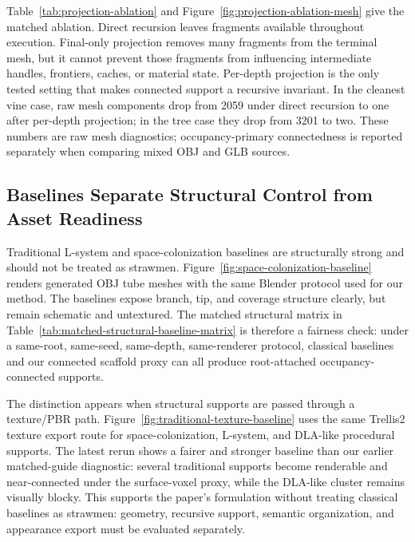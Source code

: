 \documentclass[sigconf,anonymous,review]{acmart}
\begin{document}
Table~\ref{tab:projection-ablation} and Figure~\ref{fig:projection-ablation-mesh} give the matched ablation. Direct recursion leaves fragments available throughout execution. Final-only projection removes many fragments from the terminal mesh, but it cannot prevent those fragments from influencing intermediate handles, frontiers, caches, or material state. Per-depth projection is the only tested setting that makes connected support a recursive invariant. In the cleanest vine case, raw mesh components drop from 2059 under direct recursion to one after per-depth projection; in the tree case they drop from 3201 to two. These numbers are raw mesh diagnostics; occupancy-primary connectedness is reported separately when comparing mixed OBJ and GLB sources.

\subsection{Baselines Separate Structural Control from Asset Readiness}
Traditional L-system and space-colonization baselines are structurally strong and should not be treated as strawmen. Figure~\ref{fig:space-colonization-baseline} renders generated OBJ tube meshes with the same Blender protocol used for our method. The baselines expose branch, tip, and coverage structure clearly, but remain schematic and untextured. The matched structural matrix in Table~\ref{tab:matched-structural-baseline-matrix} is therefore a fairness check: under a same-root, same-seed, same-depth, same-renderer protocol, classical baselines and our connected scaffold proxy can all produce root-attached occupancy-connected supports.

The distinction appears when structural supports are passed through a texture/PBR path. Figure~\ref{fig:traditional-texture-baseline} uses the same Trellis2 texture export route for space-colonization, L-system, and DLA-like procedural supports. The latest rerun shows a fairer and stronger baseline than our earlier matched-guide diagnostic: several traditional supports become renderable and near-connected under the surface-voxel proxy, while the DLA-like cluster remains visually blocky. This supports the paper's formulation without treating classical baselines as strawmen: geometry, recursive support, semantic organization, and appearance export must be evaluated separately.
\end{document}
